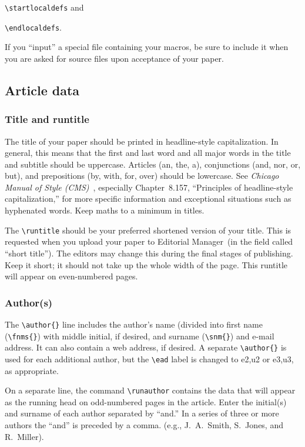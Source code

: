 \documentclass{ndjflart}
\theoremstyle{definition}
\theoremstyle{remark}
\newcommand{\EM}{Editorial Manager}
\newcommand{\mn}{\medskip\noindent}
\begin{document}
\mn \verb=\startlocaldefs= and

\mn \verb=\endlocaldefs=.

\mn If you ``input'' a special file containing your macros, be sure to
include it when you are asked for source files upon acceptance of your
paper.

\subsection{Article data}

\subsubsection{Title and runtitle}\label{tandr} The title of your paper should be
printed in headline-style capitalization. In general, this means that
the first and last word and all major words in the title and subtitle
should be uppercase. Articles (an, the, a), conjunctions (and, nor,
or, but), and prepositions (by, with, for, over) should be lowercase.
See \emph{Chicago Manual of Style (CMS)}~\cite{CMS}, especially
Chapter~8.157, ``Principles of headline-style capitalization,'' for
more specific information and exceptional situations such as
hyphenated words.  Keep maths to a minimum in titles.

The \verb=\runtitle= should be your preferred shortened version of
your title.  This is requested when you upload your paper to \EM\ (in
the field called ``short title''). The editors may change this during
the final stages of publishing.  Keep it short; it should not take up
the whole width of the page.  This runtitle will appear on
even-numbered pages.

\subsubsection{Author(s)}\label{authordata} The \verb=\author{}= line
includes the author's name (divided into first name (\verb=\fnms{}=)
with middle initial, if desired, and surname (\verb=\snm{}=) and
e-mail address.  It can also contain a web address, if desired.  A
separate \verb=\author{}= is used for each additional author, but the
\verb=\ead= label is changed to e2,u2 or e3,u3, as appropriate.

On a separate line, the command \verb=\runauthor= contains the data
that will appear as the running head on odd-numbered pages in the
article.  Enter the initial(s) and surname of each author separated by
``and.''  In a series of three or more authors the ``and'' is preceded
by a comma. (e.g., J.~A.~Smith, S.~Jones, and R.~Miller).
\end{document}
